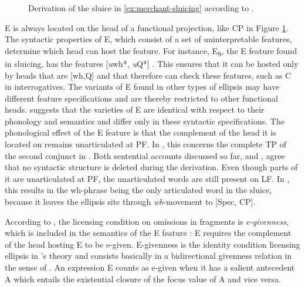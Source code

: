 \begin{figure}[t]

\caption{Derivation of the sluice in \ref{ex:merchant-sluicing} according to \citet[670]{merchant2004}.\label{fig:merchant-sluicing}}

\end{figure}
%
E is always located on the head of a functional projection, like CP in Figure \ref{fig:merchant-sluicing}. The syntactic properties of E, which consist of a set of uninterpretable features, determine which head can host the feature. For instance, E\textsubscript{S}, the E feature found in sluicing, has the features [\textit{u}wh*, \textit{u}Q*] \citep[670]{merchant2004}. This ensures that it can be hosted only by heads that are [wh,Q] and that therefore can check these features, such as C in interrogatives. The variants of E found in other types of ellipsis may have different feature specifications and are thereby restricted to other functional heads. \citet[671]{merchant2004} suggests that the varieties of E are identical with respect to their phonology and semantics and differ only in these syntactic specifications. The phonological effect of the E feature is that the complement of the head it is located on  remains unarticulated at PF. In \Last, this concerns the complete TP of the second conjunct in \Last. Both sentential accounts discussed so far, \citet{merchant2004} and \citet{reich2007}, agree that no syntactic structure is deleted during the derivation. Even though parts of it are unarticulated at PF, the unarticulated words are still present on LF. In \Last, this results in the wh-phrase being the only articulated word in the sluice, because it leaves the ellipsis site through \textit{wh}-movement to [Spec, CP].

According to \citet{merchant2004}, the licensing condition on omissions in fragments is \textit{e-givenness}, which is included in the semantics of the E feature \Next: E requires the complement of the head hosting E to be e-given. E-givenness is the identity condition licensing ellipsis in \citeauthor{merchant2001}'s theory and consists basically in a bidirectional givenness relation in the sense of \citet{schwarzschild1999}. An expression E counts as e-given when it has a salient antecedent A which entails the existential closure of the focus value of A and vice versa. 

